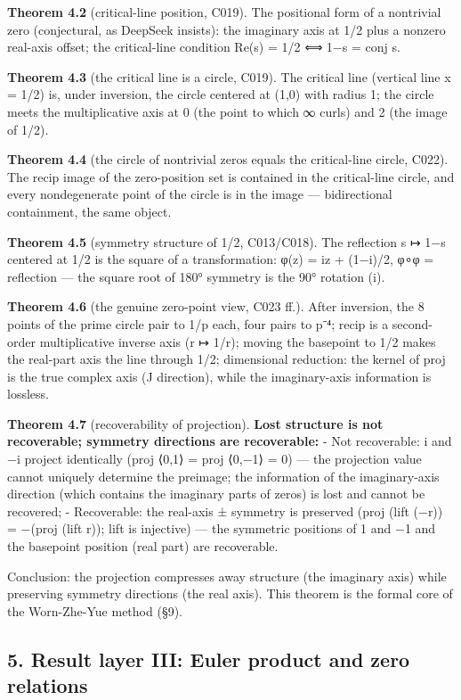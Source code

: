 \documentclass[
]{article}
\begin{document}
\textbf{Theorem 4.2} (critical-line position, C019). The positional form
of a nontrivial zero (conjectural, as DeepSeek insists): the imaginary
axis at 1/2 plus a nonzero real-axis offset; the critical-line condition
Re(s) = 1/2 ⟺ 1−s = conj s.

\textbf{Theorem 4.3} (the critical line is a circle, C019). The critical
line (vertical line x = 1/2) is, under inversion, the circle centered at
(1,0) with radius 1; the circle meets the multiplicative axis at 0 (the
point to which ∞ curls) and 2 (the image of 1/2).

\textbf{Theorem 4.4} (the circle of nontrivial zeros equals the
critical-line circle, C022). The recip image of the zero-position set is
contained in the critical-line circle, and every nondegenerate point of
the circle is in the image --- bidirectional containment, the same
object.

\textbf{Theorem 4.5} (symmetry structure of 1/2, C013/C018). The
reflection s ↦ 1−s centered at 1/2 is the square of a transformation:
φ(z) = iz + (1−i)/2, φ∘φ = reflection --- the square root of 180°
symmetry is the 90° rotation (i).

\textbf{Theorem 4.6} (the genuine zero-point view, C023 ff.). After
inversion, the 8 points of the prime circle pair to 1/p each, four pairs
to p⁻⁴; recip is a second-order multiplicative inverse axis (r ↦ 1/r);
moving the basepoint to 1/2 makes the real-part axis the line through
1/2; dimensional reduction: the kernel of proj is the true complex axis
(J direction), while the imaginary-axis information is lossless.

\textbf{Theorem 4.7} (recoverability of projection). \textbf{Lost
structure is not recoverable; symmetry directions are recoverable:} -
Not recoverable: i and −i project identically (proj ⟨0,1⟩ = proj ⟨0,−1⟩
= 0) --- the projection value cannot uniquely determine the preimage;
the information of the imaginary-axis direction (which contains the
imaginary parts of zeros) is lost and cannot be recovered; -
Recoverable: the real-axis ± symmetry is preserved (proj (lift (−r)) =
−(proj (lift r)); lift is injective) --- the symmetric positions of 1
and −1 and the basepoint position (real part) are recoverable.

Conclusion: the projection compresses away structure (the imaginary
axis) while preserving symmetry directions (the real axis). This theorem
is the formal core of the Worn-Zhe-Yue method (§9).

\subsection{5. Result layer III: Euler product and zero
relations}\label{result-layer-iii-euler-product-and-zero-relations}
\end{document}
